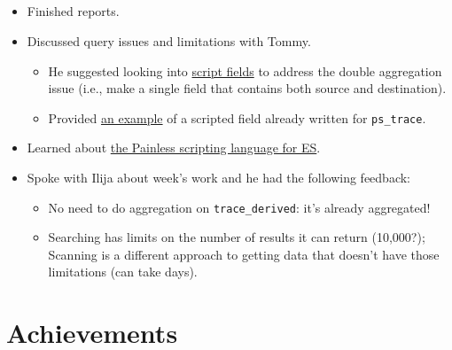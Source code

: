 \documentclass{weeklyreport}
\begin{document}
\subsection*{}

\begin{itemize}
	\item Finished reports.
	\item Discussed query issues and limitations with Tommy.
	\begin{itemize}
		\item He suggested looking into \href{https://www.elastic.co/guide/en/elasticsearch/reference/7.8/search-fields.html#script-fields}{script fields} to address the double aggregation issue (i.e., make a single field that contains both source and destination).
		\item Provided \href{https://atlas-kibana.mwt2.org:5601/s/networking/app/kibana#/management/kibana/index_patterns/45542740-0065-11e8-8f2f-ab6704660c79?_g=(filters:!(),refreshInterval:(pause:!t,value:0),time:(from:now-15m,to:now))&_a=(tab:scriptedFields)}{an example} of a scripted field already written for \texttt{ps\_trace}.
	\end{itemize}
	\item Learned about \href{https://www.elastic.co/guide/en/elasticsearch/painless/master/painless-guide.html}{the Painless scripting language for ES}.
	\item Spoke with Ilija about week's work and he had the following feedback:
	\begin{itemize}
		\item No need to do aggregation on \texttt{trace\_derived}: it's already aggregated!
		\item Searching has limits on the number of results it can return (10,000?); Scanning is a different approach to getting data that doesn't have those limitations (can take days).
	\end{itemize}
\end{itemize}

\section*{Achievements}
\end{document}
